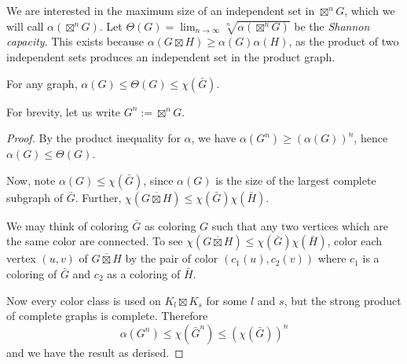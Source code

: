 We are interested in the maximum size of an independent set in $\boxtimes^n G$, which we will call $\alpha(\boxtimes^n G)$. Let $\Theta(G) = \lim_{n\to\infty} \sqrt[n]{\alpha(\boxtimes^n G)}$ be the \emph{Shannon capacity}. This exists because $\alpha(G\boxtimes H) \geq \alpha(G) \alpha(H)$, as the product of two independent sets produces an independent set in the product graph.

\begin{lemma} \label{lem:chrom_num_shannon_capacity}
For any graph, $\alpha(G) \leq \Theta(G) \leq \chi(\bar G)$.
\end{lemma} 
For brevity, let us write $G^n:=\boxtimes^n G$.
\begin{proof}	
By the product inequality for $\alpha$, we have $\alpha(G^n) \geq (\alpha(G))^n$, hence $\alpha(G) \leq \Theta(G)$.

Now, note $\alpha(G)\leq \chi(\bar G)$, since $\alpha(G)$ is the size of the largest complete subgraph of $\bar G$. Further, $\chi(\overline{G\boxtimes H}) \leq \chi(\bar G)\chi(\bar H)$.

We may think of coloring $\bar G$ as coloring $G$ such that any two vertices which are the same color are connected. To see $\chi(\overline{G\boxtimes H}) \leq \chi(\bar G)\chi(\bar H)$,  color each vertex $(u,v)$ of $\overline{G\boxtimes H}$ by the pair of color $(c_1(u),c_2(v))$ where $c_1$ is a coloring of $\bar G$ and $c_2$ as a coloring of $\bar H$.

Now every color class is used on $K_l\boxtimes K_s$ for some $l$ and $s$, but the strong product of complete graphs is complete. Therefore
\[
\alpha(G^n) \leq \chi(\bar G^n) \leq (\chi(\bar G))^n
\]
and we have the result as derised.
\end{proof}

